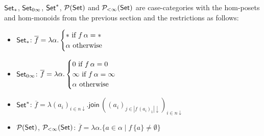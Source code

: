 \documentclass[runningheads,envcountsame]{llncs}
\begin{document}
\begin{lemma}
    $\mathsf{Set}_*$, $\mathsf{Set}_{0\infty}$, $\mathsf{Set}^*$, $\mathcal{P}(\mathsf{Set})$ and $\mathcal{P}_{<\infty}(\mathsf{Set})$ are case-categories with the hom-posets and hom-monoids from the previous section and the restrictions as follows:
    \begin{itemize}
        \item $\mathsf{Set}_*$: $\overline{f} = \lambda \alpha. \begin{cases}
            * \textnormal{ if } f\,\alpha = * \\
            \alpha \textnormal{ otherwise}
        \end{cases}$
        \item $\mathsf{Set}_{0\infty}$: $\overline{f} = \lambda \alpha. \begin{cases}
            0 \textnormal{ if } f\,\alpha = 0 \\
            \infty \textnormal{ if } f\,\alpha = \infty \\
            \alpha \textnormal{ otherwise}
        \end{cases}$
        \item $\mathsf{Set}^*$: $\overline{f} = \lambda (a_i)_{i\in n\downarrow}. \mathsf{join}\,((a_i)_{j \in |f\,(a_i)_1|\downarrow})_{i \in n\downarrow}$
        \item $\mathcal{P}(\mathsf{Set})$, $\mathcal{P}_{<\infty}(\mathsf{Set})$: $\overline{f} = \lambda \alpha. \{ a \in \alpha \mid f\,\{ a \} \neq \emptyset \}$
    \end{itemize}
\end{lemma}
\end{document}
